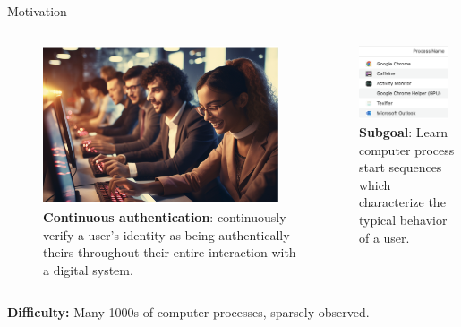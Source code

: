 \documentclass[10pt]{beamer}
\begin{document}
\begin{frame}{Motivation}

\begin{columns}[T,onlytextwidth]
    \begin{column}{0.48\textwidth}
        \centering
		\begin{figure}
	   \includegraphics[width=0.9\textwidth]{images/cont_auth}
	   \vfill 
	   \textbf{Continuous authentication}:  continuously verify a user’s identity as being authentically theirs throughout their entire interaction with a digital system. 
		\end{figure}
    \end{column}
    \begin{column}{0.48\textwidth}
        \centering

	  \includegraphics[width=0.9\textwidth]{images/activity_monitor} \\
	  \vfill 
		\textbf{Subgoal}: Learn computer process start sequences which characterize the typical behavior of a user.
    \end{column}
 \end{columns} 
 \pause
 \vfill 
 \textbf{Difficulty:} Many 1000s of computer processes, sparsely observed. 
\end{frame}
\end{document}
